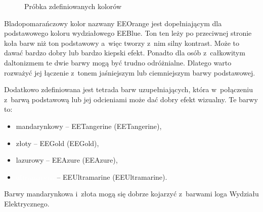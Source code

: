 \begin{figure}[!ht]
    \centering
    \caption{Próbka zdefiniowanych kolorów}
    \label{rys:colorsample}
\end{figure}

Bladopomarańczowy kolor nazwany \textcolor{EEOrange}{EEOrange} jest dopełniającym dla podstawowego koloru wydziałowego EEBlue. Ton ten leży po przeciwnej stronie koła barw niż ton podstawowy a~więc tworzy z~nim silny kontrast. Może to dawać bardzo dobry lub bardzo kiepski efekt. Ponadto dla osób z~całkowitym daltonizmem te dwie barwy mogą być trudno odróżnialne. Dlatego warto rozważyć jej łączenie z~tonem jaśniejszym lub ciemniejszym barwy podstawowej.

Dodatkowo zdefiniowana jest tetrada barw uzupełniających, która w~połączeniu z~barwą podstawową lub jej odcieniami może dać dobry efekt wizualny. Te barwy to:
\begin{itemize}
    \item \colorbox{EETangerine}{mandarynkowy} -- \textcolor{EETangerine}{EETangerine} (EETangerine),
    \item \colorbox{EEGold}{złoty} --  \textcolor{EEGold}{EEGold} (EEGold),
    \item \colorbox{EEAzure}{lazurowy} --  \textcolor{EEAzure}{EEAzure} (EEAzure),
    \item \colorbox{EEUltramarine}{\textcolor{white}{ultramaryna}} --  \textcolor{EEUltramarine}{EEUltramarine} (EEUltramarine).
\end{itemize}
Barwy mandarynkowa i~złota mogą się dobrze kojarzyć z~barwami loga Wydziału Elektrycznego.

